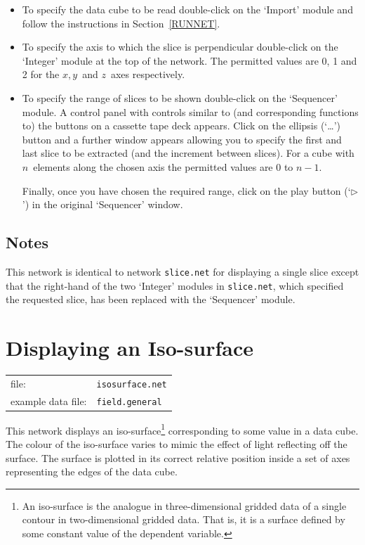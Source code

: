 \documentclass[twoside,11pt]{starlink}
\begin{document}
\begin{itemize}

  \item To specify the data cube to be read double-click on the `Import'
   module and follow the instructions in Section~\ref{RUNNET}.

  \item To specify the axis to which the slice is perpendicular
   double-click on the `Integer' module at the top of the network. The
   permitted values are 0, 1 and 2 for the $x, y$\, and $z$\, axes
   respectively.

  \item To specify the range of slices to be shown double-click on the
   `Sequencer' module. A control panel with controls similar to (and
   corresponding functions to) the buttons on a cassette tape deck
   appears. Click on the ellipsis (`\ldots') button and a further window
   appears allowing you to specify the first and last slice to be
   extracted (and the increment between slices). For a cube with $n$\,
   elements along the chosen axis the permitted values are 0 to $n-1$.

   Finally, once you have chosen the required range, click on the play
   button (`$\triangleright$') in the original `Sequencer' window.

\end{itemize}

\subsection{Notes}

This network is identical to network \texttt{slice.net} for displaying
a single slice except that the right-hand of the two `Integer' modules
in \texttt{slice.net}, which specified the requested slice, has been
replaced with the `Sequencer' module.


\newpage
\section{Displaying an Iso-surface}


\begin{tabular}{ll}
file:              & \texttt{isosurface.net} \\
example data file: & \texttt{field.general}  \\
\end{tabular}

This network displays an iso-surface\footnote{An iso-surface is the
analogue in three-dimensional gridded data of a single contour in
two-dimensional gridded data. That is, it is a surface defined by some
constant value of the dependent variable.} corresponding to some value in
a data cube. The colour of the iso-surface varies to mimic the effect
of light reflecting off the surface. The surface is plotted in its
correct relative position inside a set of axes representing the edges
of the data cube.
\end{document}
